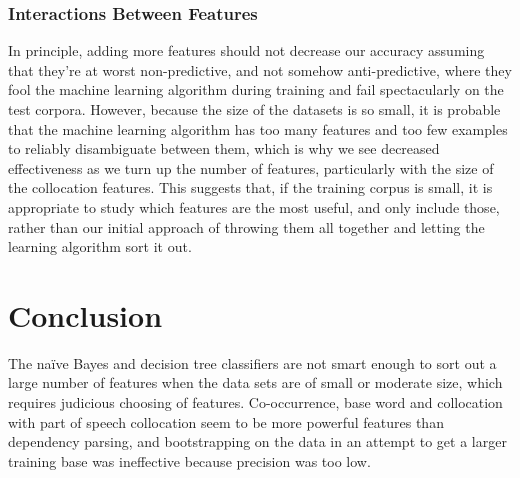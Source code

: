\documentclass{article}
\newcommand{\naive}{na\"ive}
\begin{document}
\subsubsection{Interactions Between Features}

In principle, adding more features should not decrease our accuracy assuming
that they're at worst non-predictive, and not somehow anti-predictive, where
they fool the machine learning algorithm during training and fail spectacularly
on the test corpora.  However, because the size of the datasets is so small, it
is probable that the machine learning algorithm has too many features and too
few examples to reliably disambiguate between them, which is why we see
decreased effectiveness as we turn up the number of features, particularly with
the size of the collocation features.  This suggests that, if the training
corpus is small, it is appropriate to study which features are the most useful,
and only include those, rather than our initial approach of throwing them all
together and letting the learning algorithm sort it out.

\section{Conclusion}

The \naive{} Bayes and decision tree classifiers are not smart enough to sort out
a large number of features when the data sets are of small or moderate size,
which requires judicious choosing of features.  Co-occurrence, base word and
collocation with part of speech collocation seem to be more powerful features
than dependency parsing, and bootstrapping on the data in an attempt to get a
larger training base was ineffective because precision was too low.
\end{document}

